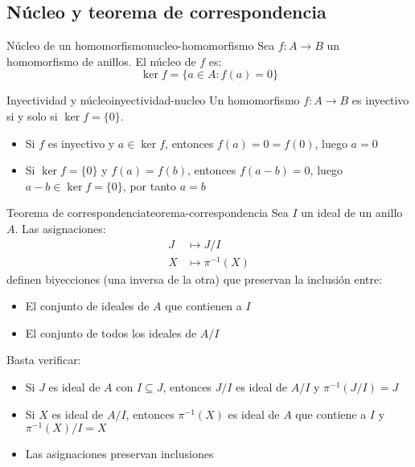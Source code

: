 \subsection{Núcleo y teorema de correspondencia}

\begin{definition}{Núcleo de un homomorfismo}{nucleo-homomorfismo}
    Sea \(f: A \to B\) un homomorfismo de anillos. El {núcleo} de \(f\) es:
    \[
    \ker f = \{a \in A : f(a) = 0\}
    \]
\end{definition}

\begin{proposition}{Inyectividad y núcleo}{inyectividad-nucleo}
    Un homomorfismo \(f: A \to B\) es inyectivo si y solo si \(\ker f = \{0\}\).
\end{proposition}

\begin{proofbox}
    \begin{itemize}
        \item Si \(f\) es inyectivo y \(a \in \ker f\), entonces \(f(a) = 0 = f(0)\), luego \(a = 0\)
        \item Si \(\ker f = \{0\}\) y \(f(a) = f(b)\), entonces \(f(a - b) = 0\), luego \(a - b \in \ker f = \{0\}\), por tanto \(a = b\)
    \end{itemize}
\end{proofbox}

\begin{theorem}{Teorema de correspondencia}{teorema-correspondencia}
    Sea \(I\) un ideal de un anillo \(A\). Las asignaciones:
    \begin{align*}
        J &\mapsto J/I \\
        X &\mapsto \pi^{-1}(X)
    \end{align*}
    definen biyecciones (una inversa de la otra) que preservan la inclusión entre:
    \begin{itemize}
        \item El conjunto de ideales de \(A\) que contienen a \(I\)
        \item El conjunto de todos los ideales de \(A/I\)
    \end{itemize}
\end{theorem}

\begin{proofbox}
    Basta verificar:
    \begin{itemize}
        \item Si \(J\) es ideal de \(A\) con \(I \subseteq J\), entonces \(J/I\) es ideal de \(A/I\) y \(\pi^{-1}(J/I) = J\)
        \item Si \(X\) es ideal de \(A/I\), entonces \(\pi^{-1}(X)\) es ideal de \(A\) que contiene a \(I\) y \(\pi^{-1}(X)/I = X\)
        \item Las asignaciones preservan inclusiones
    \end{itemize}
\end{proofbox}

